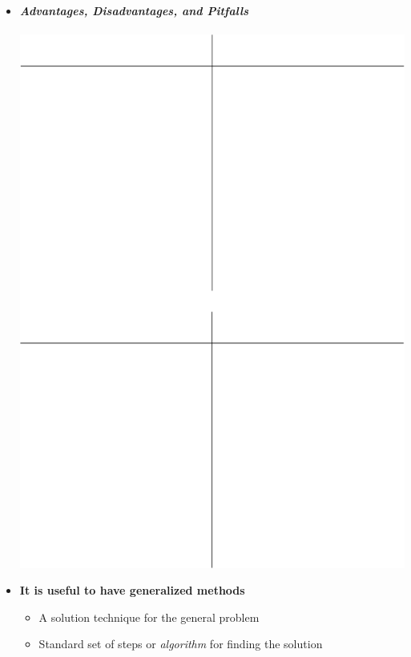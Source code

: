 \documentclass[11pt]{article}
\begin{document}
\begin{itemize}
	\newpage
	\item \textbf{ \LARGE {\it Advantages, Disadvantages, and Pitfalls} } \\\\
	\includegraphics[scale=.65]{lecture1_fig6.png}
\newpage

	\item \textbf{ \LARGE It is useful to have generalized methods }\\
		\begin{itemize}
			\item \Large{A solution technique for the general problem}\\		
			\item \Large{Standard set of steps or {\it algorithm} for finding the solution}\\\\
		\end{itemize}


\end{itemize}
\end{document}
